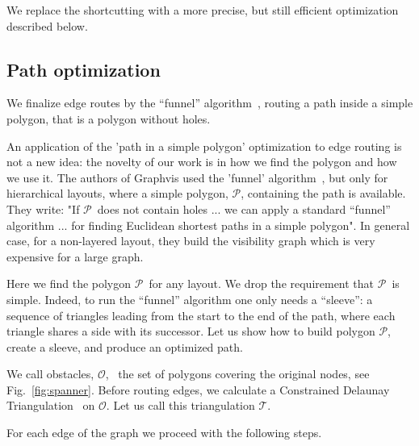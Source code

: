 \documentclass{gd-llncs}
\newcommand{\plg}{$\mathcal{P}$}
\begin{document}
We replace the shortcutting with a more precise, but still efficient optimization described below.
\subsection*{Path optimization} {
We finalize edge routes by the “funnel” algorithm~\cite{chazelle1982theorem,hershberger1994computing}, routing a path inside a simple polygon, that is a polygon without holes.

An application of the 'path in a simple polygon' optimization to edge routing is not a new idea: the novelty of our work is in how we find the polygon and how we use it.
The authors of Graphvis used the 'funnel' algorithm~\cite{dobkin1997implementing}, but only for hierarchical layouts, where a simple polygon, \plg, containing the path is available. They write: "If \plg~does not contain holes ... we can apply a
standard “funnel” algorithm ... for finding Euclidean shortest paths in a simple polygon". In general case,
for a non-layered layout, they build the visibility graph which is very expensive for a large graph.

Here we find the polygon \plg~for any layout. We drop the requirement that \plg~is simple. Indeed, to run the “funnel” algorithm one only needs a “sleeve”: a sequence of triangles leading from the start to the end of the path, where each triangle shares a side with its successor. Let us show how to build polygon \plg, create a sleeve, and produce an optimized path.

We call obstacles, $\mathcal{O}$, ~the set of polygons covering the original nodes, see Fig.~\ref{fig:spanner}. Before routing edges, we calculate a Constrained Delaunay Triangulation~\cite{delaunay1934sphere} on $\mathcal{O}$. Let us call this triangulation $\mathcal{T}$.

For each edge of the graph we proceed with the following steps.

}
\end{document}
